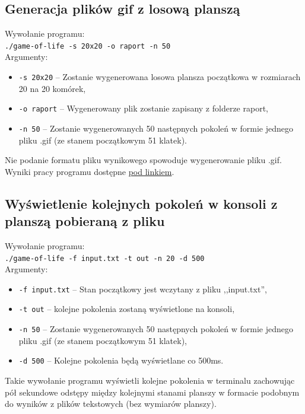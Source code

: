 \documentclass{mwart}
\begin{document}
\subsection{Generacja plików gif z losową planszą}
\noindent{}Wywołanie programu: \\
\texttt{./game-of-life -s 20x20 -o raport -n 50} \\
Argumenty:
\begin{itemize}
\item \texttt{-s 20x20} -- Zostanie wygenerowana losowa plansza początkowa w rozmiarach 20 na 20 komórek,
\item \texttt{-o raport} -- Wygenerowany plik zostanie zapisany z folderze raport,
\item \texttt{-n 50} -- Zostanie wygenerowanych 50 następnych pokoleń w formie jednego pliku .gif (ze stanem początkowym 51 klatek).\\
\end{itemize}
Nie podanie formatu pliku wynikowego spowoduje wygenerowanie pliku .gif.
\vspace{5mm}
Wyniki pracy programu dostępne \href{https://github.com/SiwyKrzysiek/gra-w-zycie/tree/report/code/raport}{\textcolor{LinkColor}{pod linkiem}}.

\subsection{Wyświetlenie kolejnych pokoleń w konsoli z planszą pobieraną z pliku}
\noindent{}Wywołanie programu: \\
\texttt{./game-of-life -f input.txt -t out -n 20 -d 500} \\
Argumenty:
\begin{itemize}
\item \texttt{-f input.txt} -- Stan początkowy jest wczytany z pliku ,,input.txt'',
\item \texttt{-t out} -- kolejne pokolenia zostaną wyświetlone na konsoli,
\item \texttt{-n 50} -- Zostanie wygenerowanych 50 następnych pokoleń w formie jednego pliku .gif (ze stanem początkowym 51 klatek),
\item \texttt{-d 500} -- Kolejne pokolenia będą wyświetlane co 500ms.\\
\end{itemize}

\noindent Takie wywołanie programu wyświetli kolejne pokolenia w terminalu zachowując pół sekundowe odstępy między kolejnymi stanami planszy w formacie podobnym do wyników z plików tekstowych (bez wymiarów planszy).
\end{document}
